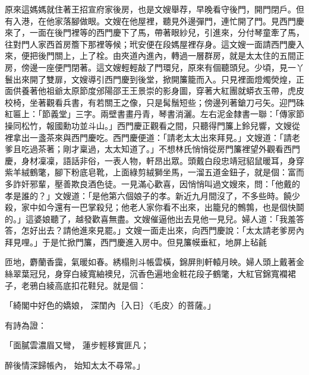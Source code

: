 \begin{showcontents}{}
原來這媽媽就住著王招宣府家後房，也是文嫂舉荐，早晚看守後門，開門閉戶。但有入港，在他家落腳做眼。文嫂在他屋裡，聽見外邊彈門，連忙開了門。見西門慶來了，一面在後門裡等的西門慶下了馬，帶著眼紗兒，引進來，分付琴童牽了馬，往對門人家西首房簷下那裡等候；玳安便在段媽屋裡存身。這文嫂一面請西門慶入來，便把後門關上，上了栓。由夾道內進內，轉過一層群房，就是太太住的五間正房，傍邊一座便門閉著。這文嫂輕輕敲了門環兒，原來有個聽頭兒。少頃，見一丫鬟出來開了雙扉，文嫂導引西門慶到後堂，掀開簾籠而入。只見裡面燈燭熒煌，正面供養著他祖爺太原節度邠陽邵王王景崇的影身圖，穿著大紅團就蟒衣玉帶，虎皮校椅，坐著觀看兵書，有若關王之像，只是髯鬚短些；傍邊列著鎗刀弓矢。迎門硃紅匾上：「節義堂」三字。兩壁書畫丹青，琴書消灑。左右泥金隸書一聯：「傳家節操同松竹，報國勳功並斗山。」西門慶正觀看之間，只聽得門簾上鈴兒響，文嫂從裡拿出一盞茶來與西門慶吃。西門慶便道：「請老太太出來拜見。」文嫂道：「請老爹且吃過茶著；剛才稟過，太太知道了。」不想林氏悄悄從房門簾裡望外觀看西門慶，身材凜凜，語話非俗，一表人物，軒昂出眾。頭戴白段忠靖冠貂鼠暖耳，身穿紫羊絨鶴氅，腳下粉底皂靴，上面綠剪絨獅坐馬，一溜五道金鈕子，就是個：富而多詐奸邪輩，壓善欺良酒色徒。一見滿心歡喜，因悄悄叫過文嫂來，問：「他戴的孝是誰的？」文嫂道：「是他第六個娘子的孝。新近九月間沒了，不多些時。饒少殺，家中如今還有一巴掌殺兒；他老人家你看不出來，出籠兒的鷯鶉，也是個快鬬的。」這婆娘聽了，越發歡喜無盡。文嫂催逼他出去見他一見兒。婦人道：「我羞答答，怎好出去？請他進來見罷。」文嫂一面走出來，向西門慶說：「太太請老爹房內拜見哩。」于是忙掀門簾，西門慶進入房中。但見簾幙垂紅，地屏上毡毹

匝地，麝蘭香靄，氣暖如春。綉榻則斗帳雲橫，錦屏則軒轅月映。婦人頭上戴著金絲翠葉冠兒，身穿白綾寬紬襖兒，沉香色遍地金粧花段子鶴氅，大紅官錦寬襴裙子，老鴉白綾高底扣花鞋兒。就是個：

「綺閣中好色的嬌娘，  深閨內｛入日｝〈毛皮〉的菩薩。」

有詩為證：

「面膩雲濃眉又彎，  蓮步輕移實匪凡；

醉後情深歸帳內，  始知太太不尋常。」


\end{showcontents}
